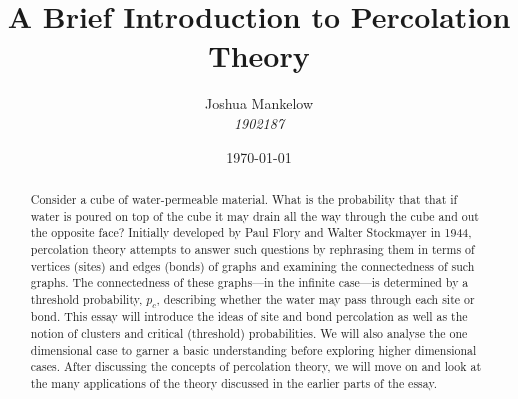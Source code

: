 \documentclass[a4paper,11pt]{article}
\title{\textbf{ A Brief Introduction to Percolation Theory }}
\author{Joshua Mankelow \\ \textit{1902187}}
\date{\today}
\theoremstyle{plain} %
\theoremstyle{definition} %
\theoremstyle{remark} %
\begin{document}
  
\maketitle


\begin{abstract}
  Consider a cube of water-permeable material. What is the probability that that if water is poured on top of the cube it may drain all the way through
  the cube and out the opposite face? 
  Initially developed by Paul Flory and Walter Stockmayer in 1944, percolation theory attempts to answer such questions by rephrasing them
  in terms of vertices (sites) and edges (bonds) of graphs and examining the connectedness of such graphs. The connectedness of these graphs---in the infinite case---is
  determined by a threshold probability, $p_c$, describing whether the water may pass through each site or bond.
  This essay will introduce the ideas of site and bond percolation as well as the notion of clusters and critical (threshold) probabilities.
  We will also analyse the one dimensional case to garner a basic understanding before exploring higher dimensional cases. After discussing the concepts of percolation theory, we will move on and look at the many applications of the
  theory discussed in the earlier parts of the essay.
\end{abstract}

\newpage

\tableofcontents

\newpage









\end{document}
